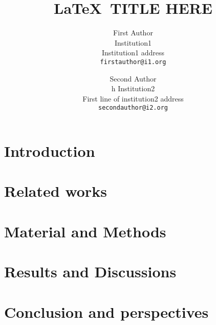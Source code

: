 \documentclass[10pt,twocolumn,letterpaper]{article}
\begin{document}
\newcommand\tim[2]{{\color{red}#1}{\vphantom{#2}}}
\newcommand\alien[2]{{\color{blue}#1}{\vphantom{#2}}}

\title{\LaTeX\ TITLE HERE }

\author{First Author\\
Institution1\\
Institution1 address\\
{\tt\small firstauthor@i1.org}
\and
Second Author\\
h
Institution2\\
First line of institution2 address\\
{\tt\small secondauthor@i2.org}
}

\maketitle

\begin{abstract}

\end{abstract}

\section{Introduction}

\section{Related works}

\section{Material and Methods}

\section{Results and Discussions}



\section{Conclusion and perspectives}


{\small


}
\end{document}

